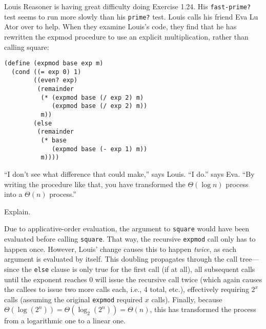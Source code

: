 \documentclass{../../sicp}
\date{August 26, 2024}
\begin{document}
\maketitle

\begin{displayquote}
	Louis Reasoner is having great difficulty doing Exercise 1.24.
	His \texttt{fast-prime?} test seems to run more slowly than his \texttt{prime?} test.
	Louis calls his friend Eva Lu Ator over to help.
	When they examine Louis’s code, they find that he has rewritten the expmod procedure to use an explicit multiplication, rather than calling square:

	\begin{lstlisting}
(define (expmod base exp m)
  (cond ((= exp 0) 1)
        ((even? exp)
         (remainder
          (* (expmod base (/ exp 2) m)
             (expmod base (/ exp 2) m))
          m))
        (else
         (remainder 
          (* base 
             (expmod base (- exp 1) m))
          m))))
  \end{lstlisting}
	“I don’t see what difference that could make,” says Louis. “I do.” says Eva. “By writing the procedure like that, you have transformed the $\Theta(\log n)$ process into a $\Theta(n)$ process.”

	Explain.
\end{displayquote}

Due to applicative-order evaluation, the argument to \texttt{square} would have been evaluated before calling \texttt{square}.
That way, the recursive \texttt{expmod} call only has to happen once.
However, Louis' change causes this to happen \emph{twice}, as each argument is evaluated by itself.
This doubling propagates through the call tree---since the \texttt{else} clause is only true for the first call (if at all), all subsequent calls until the exponent reaches 0 will issue the recursive call twice (which again causes the callees to issue two more calls each, i.e., 4 total, etc.), effectively requiring $2^x$ calls (assuming the original \texttt{expmod} required $x$ calls).
Finally, because $\Theta(\log(2^n)) = \Theta(\log_2(2^n)) = \Theta(n)$, this has transformed the process from a logarithmic one to a linear one.
\end{document}
